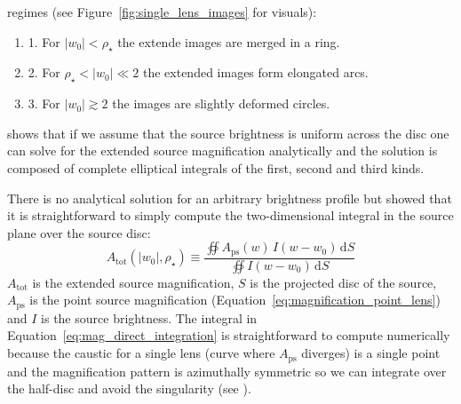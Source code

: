 \documentclass[12pt,dvipsnames]{report}
\newcommand{\ud}{\,\mathrm{d}}
\begin{document}
regimes (see Figure~\ref{fig:single_lens_images} for visuals):
\begin{enumerate}
    \item 1. For $|w_0| < \rho_\star$ the extende images are merged in a ring.
    \item 2. For $\rho_\star < |w_0| \ll 2$ the extended images form elongated arcs.
    \item 3. For $|w_0| \gtrsim  2$ the images are slightly deformed  circles.
\end{enumerate}
\citet{1994ApJ...430..505W} shows that if we assume that the source brightness is
uniform across the disc one can solve for the extended source magnification analytically
and the solution is composed of complete elliptical integrals of the first, second
and third kinds.

There is no analytical solution for an arbitrary brightness profile but
\citet{2009ApJ...695..200L} showed that it is straightforward to simply compute
the two-dimensional integral in the source plane over the source disc:
\begin{equation}
    A_\mathrm{tot}(|w_0|,\rho_\star)\equiv \frac{\oiint A_\mathrm{ps}(w)\,I(w - w_0)\ud S}{
        \oiint I(w - w_0)\ud S}
    \label{eq:mag_direct_integration}
\end{equation}
$A_\mathrm{tot}$ is the extended source magnification, $S$ is the projected
disc of the source, $A_\mathrm{ps}$ is the point source magnification
(Equation~\ref{eq:magnification_point_lens}) and $I$ is the source brightness.
The integral in Equation~\ref{eq:mag_direct_integration} is straightforward to
compute numerically because the caustic for a single lens (curve where 
$A_\mathrm{ps}$ diverges) is a single point and the magnification pattern is 
azimuthally symmetric so we can integrate over the half-disc and avoid the 
singularity (see \citet{2009ApJ...695..200L}).
\end{document}

